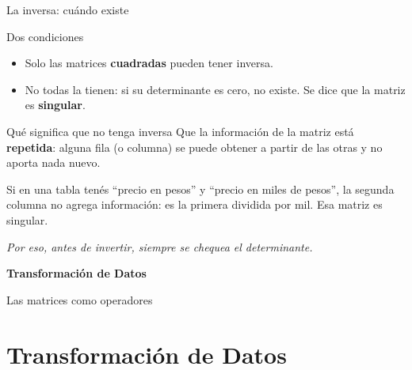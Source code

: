 \documentclass[aspectratio=169,10pt]{beamer}
\begin{document}
\begin{frame}{La inversa: cuándo existe}

\begin{block}{Dos condiciones}
\begin{itemize}
    \item Solo las matrices \textbf{cuadradas} pueden tener inversa.
    \item No todas la tienen: si su determinante es cero, no existe. Se dice que la matriz es
          \textbf{singular}.
\end{itemize}
\end{block}

\vspace{0.3cm}
\begin{alertblock}{Qué significa que no tenga inversa}
Que la información de la matriz está \textbf{repetida}: alguna fila (o columna) se puede obtener a
partir de las otras y no aporta nada nuevo.

Si en una tabla tenés ``precio en pesos'' y ``precio en miles de pesos'', la segunda columna no
agrega información: es la primera dividida por mil. Esa matriz es singular.
\end{alertblock}

\vspace{0.2cm}
\begin{center}
\textit{Por eso, antes de invertir, siempre se chequea el determinante.}
\end{center}
\end{frame}

\begin{frame}
\begin{center}
\vspace{1.5cm}
\Huge \textbf{Transformación de Datos}

\vspace{0.5cm}
\Large Las matrices como operadores
\end{center}
\end{frame}

\section{Transformación de Datos}
\end{document}
